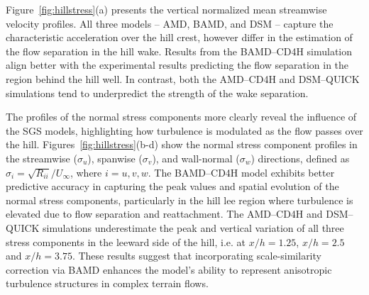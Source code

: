 \documentclass[final,3p]{elsarticle}
\begin{document}
Figure~\ref{fig:hillstress}(a) presents the vertical normalized mean streamwise velocity profiles. All three models -- AMD, BAMD, and DSM -- capture the characteristic acceleration over the hill crest, however differ in the estimation of the flow separation in the hill wake. Results from the BAMD--CD4H simulation align better with the experimental results predicting the flow separation in the region behind the hill well. In contrast, both the AMD--CD4H and DSM--QUICK simulations tend to underpredict the strength of the wake separation. 

The profiles of the normal stress components more clearly reveal the influence of the SGS models, highlighting how turbulence is modulated as the flow passes over the hill. Figures~\ref{fig:hillstress}(b-d) show the normal stress component profiles in the streamwise ($ \sigma_u $), spanwise ($ \sigma_v $), and wall-normal ($ \sigma_w $) directions, defined as $ \sigma_i = \sqrt{R_{ii}} / U_{\infty} $, where $ i = u, v, w $. The BAMD--CD4H model exhibits better predictive accuracy in capturing the peak values and spatial evolution of the normal stress components, particularly in the hill lee region where turbulence is elevated due to flow separation and reattachment. The AMD--CD4H and DSM--QUICK simulations underestimate the peak and vertical variation of all three stress components in the leeward side of the hill, i.e. at $ x/h = 1.25 $, $ x/h = 2.5 $ and $ x/h = 3.75 $. These results suggest that incorporating scale-similarity correction via BAMD enhances the model’s ability to represent anisotropic turbulence structures in complex terrain flows.
\end{document}

